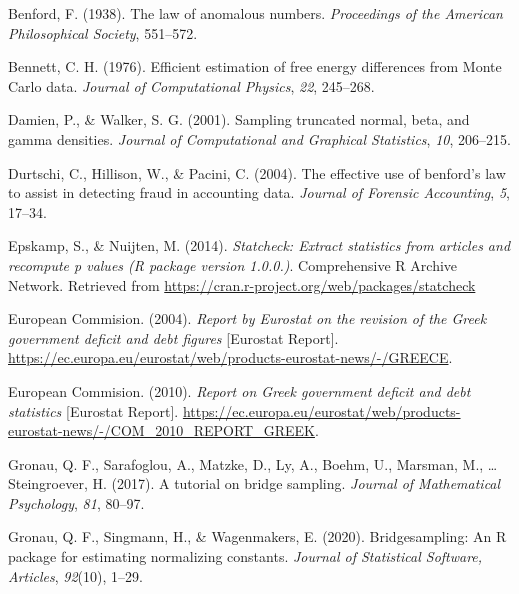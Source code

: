 \documentclass[
  english,
  man,floatsintext]{apa6}
\newlength{\cslhangindent}
\newenvironment{cslreferences}%
  {\setlength{\parindent}{0pt}%
  \everypar{\setlength{\hangindent}{\cslhangindent}}\ignorespaces}%
  {\par}
\begin{document}
\hypertarget{refs}{}
\begin{cslreferences}
\leavevmode\hypertarget{ref-benford1938law}{}%
Benford, F. (1938). The law of anomalous numbers. \emph{Proceedings of the American Philosophical Society}, 551--572.

\leavevmode\hypertarget{ref-bennett1976efficient}{}%
Bennett, C. H. (1976). Efficient estimation of free energy differences from Monte Carlo data. \emph{Journal of Computational Physics}, \emph{22}, 245--268.

\leavevmode\hypertarget{ref-damien2001sampling}{}%
Damien, P., \& Walker, S. G. (2001). Sampling truncated normal, beta, and gamma densities. \emph{Journal of Computational and Graphical Statistics}, \emph{10}, 206--215.

\leavevmode\hypertarget{ref-durtschi2004effective}{}%
Durtschi, C., Hillison, W., \& Pacini, C. (2004). The effective use of benford's law to assist in detecting fraud in accounting data. \emph{Journal of Forensic Accounting}, \emph{5}, 17--34.

\leavevmode\hypertarget{ref-epskamp2014statcheck}{}%
Epskamp, S., \& Nuijten, M. (2014). \emph{Statcheck: Extract statistics from articles and recompute p values (R package version 1.0.0.)}. Comprehensive R Archive Network. Retrieved from \url{https://cran.r-project.org/web/packages/statcheck}

\leavevmode\hypertarget{ref-europeanCommision2004}{}%
European Commision. (2004). \emph{Report by Eurostat on the revision of the Greek government deficit and debt figures} {[}Eurostat Report{]}. \url{https://ec.europa.eu/eurostat/web/products-eurostat-news/-/GREECE}.

\leavevmode\hypertarget{ref-europeanCommision2010}{}%
European Commision. (2010). \emph{Report on Greek government deficit and debt statistics} {[}Eurostat Report{]}. \url{https://ec.europa.eu/eurostat/web/products-eurostat-news/-/COM_2010_REPORT_GREEK}.

\leavevmode\hypertarget{ref-gronau2017tutorial}{}%
Gronau, Q. F., Sarafoglou, A., Matzke, D., Ly, A., Boehm, U., Marsman, M., \ldots{} Steingroever, H. (2017). A tutorial on bridge sampling. \emph{Journal of Mathematical Psychology}, \emph{81}, 80--97.

\leavevmode\hypertarget{ref-gronau2017bridgesampling}{}%
Gronau, Q. F., Singmann, H., \& Wagenmakers, E. (2020). Bridgesampling: An R package for estimating normalizing constants. \emph{Journal of Statistical Software, Articles}, \emph{92}(10), 1--29.


\end{cslreferences}
\end{document}

